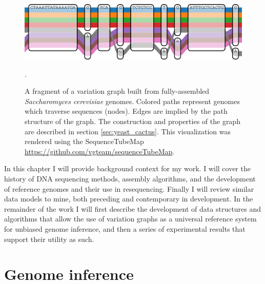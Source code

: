\begin{figure}[htbp!]
  \centering
  \includegraphics[width=1.0\textwidth]{Chapter1/Figs/vg_tubemap.pdf}
  \caption[A variation graph]{
    A fragment of a variation graph built from fully-assembled \emph{Saccharomyces cerevisiae} genomes.
    Colored paths represent genomes which traverse sequences (nodes).
    Edges are implied by the path structure of the graph.
    The construction and properties of the graph are described in section \ref{sec:yeast_cactus}.
    This visualization was rendered using the SequenceTubeMap \url{https://github.com/vgteam/sequenceTubeMap}.
    } 
\label{fig:pangenomic_processes}.
\end{figure}

In this chapter I will provide background context for my work.
I will cover the history of DNA sequencing methods, assembly algorithms, and the development of reference genomes and their use in resequencing.
Finally I will review similar data models to mine, both preceding and contemporary in development.
In the remainder of the work I will first describe the development of data structures and algorithms that allow the use of variation graphs as a universal reference system for unbiased genome inference, and then a series of experimental results that support their utility as such.

\section{Genome inference}

